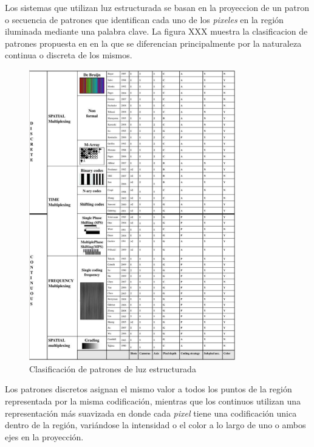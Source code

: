 Los sistemas que utilizan luz estructurada se basan en la proyeccion de un patron o secuencia de patrones que identifican cada uno de los \emph{pixeles} en la región iluminada mediante una palabra clave. 
La figura XXX muestra la clasificacion de patrones propuesta en \cite{SLightClassification} en la que se diferencian principalmente por la naturaleza continua o discreta de los mismos. 

\begin{figure}[H]
  \centering
    \includegraphics[width=0.8\textwidth]{./Cap2_videomapping/SL-patternclassiff.png}
  \caption{Clasificación de patrones de luz estructurada \cite{SLightClassification}}
  \label{fig:SLPatternClassification}
\end{figure}

Los patrones discretos asignan el mismo valor a todos los puntos de la región representada por la misma codificación, mientras que los continuos utilizan una representación más suavizada en donde cada \emph{pixel} tiene una codificación unica dentro de la región, variándose la intensidad o el color a lo largo de uno o ambos ejes en la proyección.

